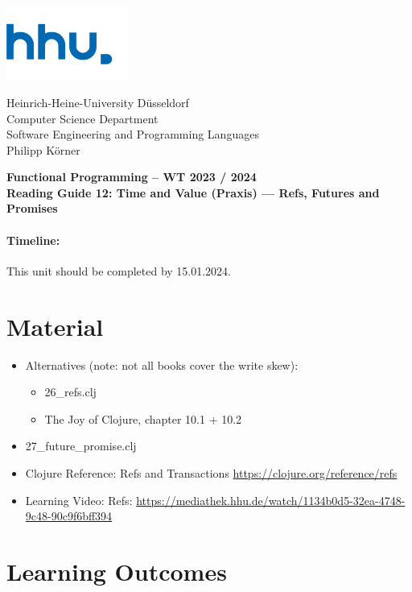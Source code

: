\documentclass[11pt,a4paper]{article}
\begin{document}
\begin{minipage}[b]{\textwidth}
	\parbox[t]{5cm}{%
		\includegraphics[width=4cm]{unilogo}
		\hfill
	}
	\parbox[b]{11cm}{%
		Heinrich-Heine-University D\"usseldorf\\
		Computer Science Department\\
		Software Engineering and Programming Languages\\
		Philipp K\"orner
	}
\end{minipage}
\begin{center}
	\bf
	Functional Programming -- WT 2023 / 2024\\
	Reading Guide 12: Time and Value (Praxis) --- Refs, Futures and Promises
\end{center}

\pagestyle{empty}

\paragraph{Timeline:} This unit should be completed by 15.01.2024.

\section{Material} 

\begin{itemize}
    \item Alternatives (note: not all books cover the write skew):
        \begin{itemize}
            \item 26\_refs.clj
            \item The Joy of Clojure, chapter 10.1 + 10.2
        \end{itemize}
            \item 27\_future\_promise.clj
    \item Clojure Reference: Refs and Transactions \url{https://clojure.org/reference/refs}
    \item Learning Video: Refs: \url{https://mediathek.hhu.de/watch/1134b0d5-32ea-4748-9c48-90c9f6bff394}
\end{itemize}


\section{Learning Outcomes}
\end{document}
